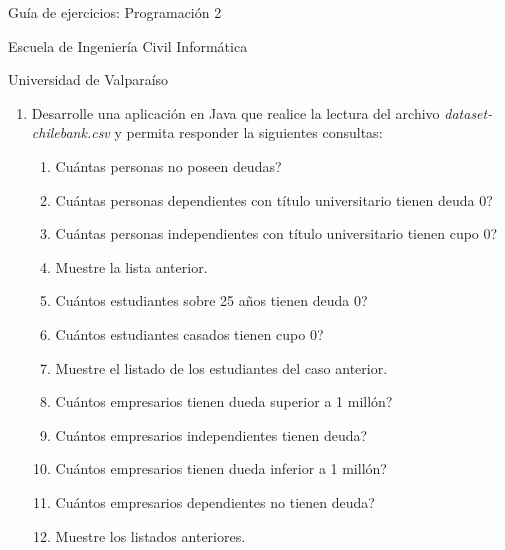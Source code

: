 \documentclass{article}
\begin{document}
	\centerline{\sc \large Gu\'ia de ejercicios: Programaci\'on 2}
	\centerline{\sc \normalsize Escuela de Ingenier\'ia Civil Inform\'atica}
	\centerline{\sc \normalsize  Universidad de Valpara\'iso}

	\vspace{1pc}

	\begin{enumerate}
	    \item[] Desarrolle una aplicaci\'on en Java que realice la lectura del archivo \emph{dataset-chilebank.csv} y permita responder la siguientes consultas:
	    \begin{enumerate}
	        \item \textquestiondown Cu\'antas personas no poseen deudas?
            \item \textquestiondown Cu\'antas personas dependientes con t\'itulo universitario tienen deuda 0?
            \item \textquestiondown Cu\'antas personas independientes con t\'itulo universitario tienen cupo 0?
	        \item Muestre la lista anterior.
	        \item \textquestiondown Cu\'antos estudiantes sobre 25 a\~nos tienen deuda 0?
	        \item \textquestiondown Cu\'antos estudiantes casados tienen cupo 0?
	        \item Muestre el listado de los estudiantes del caso anterior.
	        \item \textquestiondown Cu\'antos empresarios tienen dueda superior a 1 mill\'on?
	        	\item \textquestiondown Cu\'antos empresarios independientes tienen deuda?
	        \item \textquestiondown Cu\'antos empresarios tienen dueda inferior a 1 mill\'on?
	        	\item \textquestiondown Cu\'antos empresarios dependientes no tienen deuda?
	        \item Muestre los listados anteriores.
	    \end{enumerate}
	\end{enumerate}
\end{document}
